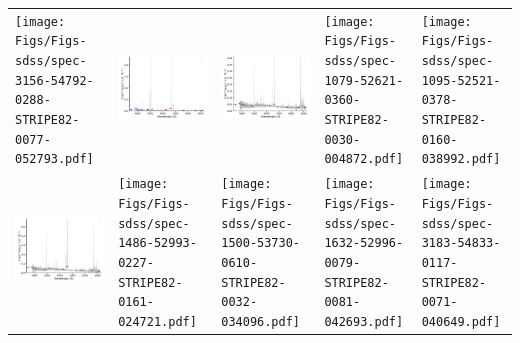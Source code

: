 \begin{center}
\begin{longtable}{l l l l l }
    \texttt{[image: Figs/Figs-sdss/spec-3156-54792-0288-STRIPE82-0077-052793.pdf]} & \includegraphics[width=0.19\linewidth, clip]{Figs/Figs-sdss/spec-0914-52721-0431-SPLUS-n03s43-048919.pdf} & \includegraphics[width=0.19\linewidth, clip]{Figs/Figs-sdss/spec-1035-52816-0289-SPLUS-s02s08-035461.pdf} & \texttt{[image: Figs/Figs-sdss/spec-1079-52621-0360-STRIPE82-0030-004872.pdf]} & \texttt{[image: Figs/Figs-sdss/spec-1095-52521-0378-STRIPE82-0160-038992.pdf]} \\
    \includegraphics[width=0.19\linewidth, clip]{Figs/Figs-sdss/spec-1117-52885-0395-STRIPE82-0100-021070.pdf} & \texttt{[image: Figs/Figs-sdss/spec-1486-52993-0227-STRIPE82-0161-024721.pdf]} & \texttt{[image: Figs/Figs-sdss/spec-1500-53730-0610-STRIPE82-0032-034096.pdf]} & \texttt{[image: Figs/Figs-sdss/spec-1632-52996-0079-STRIPE82-0081-042693.pdf]} & \texttt{[image: Figs/Figs-sdss/spec-3183-54833-0117-STRIPE82-0071-040649.pdf]} \\

\end{longtable}
\end{center}
